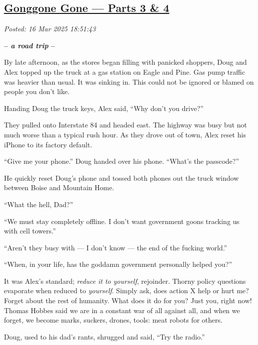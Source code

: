 %

\subsection*{\href{http://analyzethedatanotthedrivel.org/2025/03/16/gonggone-gone-parts-3-4/}{Gonggone Gone --- Parts 3 \& 4}}


\noindent\emph{Posted: 16 Mar 2025 18:51:43}
\vspace{6pt}

\begin{center}\large\textbf{-- \emph{a road trip} --}\normalsize\end{center}

By late afternoon, as the stores began filling with panicked shoppers,
Doug and Alex topped up the truck at a gas station on Eagle and Pine.
Gas pump traffic was heavier than usual. It was sinking in. This could
not be ignored or blamed on people you don't like.

Handing Doug the truck keys, Alex said, ``Why don't you drive?''

They pulled onto Interstate 84 and headed east. The highway was busy but
not much worse than a typical rush hour. As they drove out of town, Alex
reset his iPhone to its factory default.

``Give me your phone.'' Doug handed over his phone. ``What's the
passcode?''

He quickly reset Doug's phone and tossed both phones out the truck
window between Boise and Mountain Home.

``What the hell, Dad?''

``We must stay completely offline. I don't want government goons
tracking us with cell towers.''

``Aren't they busy with --- I don't know --- the end of the fucking
world.''

``When, in your life, has the goddamn government personally helped
you?''

It was Alex's standard; \emph{reduce it to yourself}, rejoinder. Thorny
policy questions evaporate when reduced to \emph{yourself}. Simply ask,
does action X help or hurt me? Forget about the rest of humanity. What
does it do for you? Just you, right now! Thomas Hobbes said we are in a
constant war of all against all, and when we forget, we become marks,
suckers, drones, tools: meat robots for others.

Doug, used to his dad's rants, shrugged and said, ``Try the radio.''

